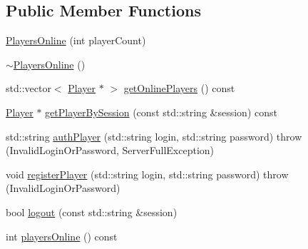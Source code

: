 \subsection*{Public Member Functions}
\begin{DoxyCompactItemize}
\item 
\hyperlink{class_players_online_a8496d232e48655c31e1f74539f11c985}{Players\-Online} (int player\-Count)
\item 
\hyperlink{class_players_online_a2446f8f355a04a40b06ce17032b9c7a1}{$\sim$\-Players\-Online} ()
\item 
std\-::vector$<$ \hyperlink{struct_player}{Player} $\ast$ $>$ \hyperlink{class_players_online_ab68bbbd25086eb09f875c7773cc784e6}{get\-Online\-Players} () const 
\item 
\hyperlink{struct_player}{Player} $\ast$ \hyperlink{class_players_online_a12d773bb368cdcb3fb6137fc19805281}{get\-Player\-By\-Session} (const std\-::string \&session) const 
\item 
std\-::string \hyperlink{class_players_online_a5b778414970f89fa01e999c9200c7001}{auth\-Player} (std\-::string login, std\-::string password)  throw (\-Invalid\-Login\-Or\-Password, Server\-Full\-Exception)
\item 
void \hyperlink{class_players_online_a26463b293d6c3c38ff600f4b363283cc}{register\-Player} (std\-::string login, std\-::string password)  throw (\-Invalid\-Login\-Or\-Password)
\item 
bool \hyperlink{class_players_online_a3469d271cd5b7ff8f5e7cbab8ff31b6d}{logout} (const std\-::string \&session)
\item 
int \hyperlink{class_players_online_acace980a0794f56eecab5ddf01ff51c7}{players\-Online} () const 
\end{DoxyCompactItemize}


